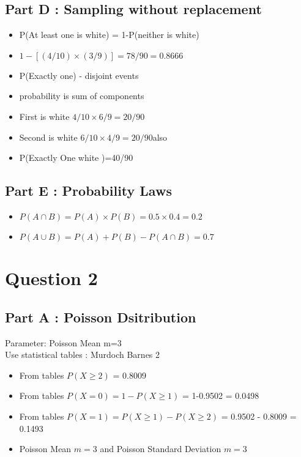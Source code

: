 \subsection*{Part D : Sampling without replacement}

\begin{itemize}
\item P(At least one is white) = 1-P(neither is white)
\item $1- \left[(4/10)\times (3/9)\right]  = 78/90 = 0.8666$
\item P(Exactly one) - disjoint events
\item probability is sum of components
\item First is white $4/10 \times 6/9 =20/90$
\item Second is white $6/10 \times 4/9 =20/90 $also
\item P(Exactly One white )=40/90
\end{itemize}

\subsection*{Part E : Probability Laws}
\begin{itemize}
\item $P(A \cap B)  = P(A) \times P(B) = 0.5\times 0.4 = 0.2 $
\item $P(A \cup B)  = P(A) + P(B) - P(A \cap B) = 0.7$
\end{itemize}

\newpage
\section*{Question 2}
\subsection*{Part A : Poisson Dsitribution}
Parameter: Poisson Mean m=3\\
Use statistical tables : Murdoch Barnes 2\\
\begin{itemize}
\item From tables $P(X \geq 2)$ = 0.8009
\item From tables $P(X = 0) = 1-P(X \geq 1)$ = 1-0.9502 = 0.0498
\item From tables $P(X = 1) = P(X \geq 1) - P(X \geq 2) $ = 0.9502 - 0.8009 = 0.1493
\item Poisson Mean $m=3$  and Poisson Standard Deviation $m=3$
\end{itemize}
